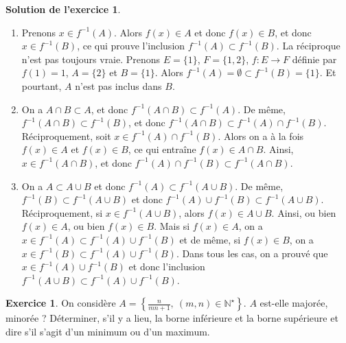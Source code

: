 \documentclass[a4paper, 11pt,openany]{article}%
\theoremstyle{plain}
\theoremstyle{definition}
\newtheorem{exo}{Exercice}
\newtheorem{sol}{Solution de l'exercice}
\theoremstyle{remark}
\newcommand{\N}{\mathbb{N}}
\begin{document}
\begin{sol}
\begin{enumerate}
\item Prenons $x\in f^{-1}(A)$. Alors $f(x) \in A$ et donc $f(x) \in B$, et donc $x \in f^{-1}(B)$, ce qui prouve l'inclusion $f^{-1}(A) \subset f^{-1}(B)$. La réciproque n'est pas toujours vraie. Prenons $E=\{1\}$, $F=\{1,2\}$, $f:E \to F$ définie par $f(1)=1$, $A=\{2\}$ et $B=\{1\}$. Alors $f^{-1}(A)= \emptyset \subset f^{-1}(B)=\{1\}$. Et pourtant, $A$ n'est pas inclus dans $B$.
\item On a $A \cap B\subset A$, et donc $f^{-1}(A \cap B) \subset f^{-1}(A)$. De même, $f^{-1}(A \cap B)\subset f^{-1}(B)$, et donc $f^{-1}(A\cap B) \subset f^{-1}(A) \cap f^{-1}(B)$.\\
Réciproquement, soit $x\in f^{-1}(A) \cap f^{-1}(B)$. Alors on a à la fois $f(x) \in A$ et $f(x) \in B$, ce qui entraîne $f(x) \in A \cap B$. Ainsi, $x \in f^{-1}(A\cap B)$, et donc $f^{-1}(A) \cap f^{-1}(B) \subset f^{-1}(A\cap B)$.
\item On a $A \subset A \cup B$ et donc $f^{-1}(A) \subset f^{-1}(A \cup B)$. De même, $f^{-1}(B) \subset f^{-1}(A \cup B)$ et donc $f^{-1}(A) \cup f^{-1}(B) \subset f^{-1}(A \cup B)$.\\
Réciproquement, si $x \in f^{-1}(A \cup B)$, alors $f(x) \in A \cup B$. Ainsi, ou bien $f(x) \in A$, ou bien $f(x) \in B$. Mais si $f(x) \in A$, on a $x \in f^{-1}(A) \subset f^{-1}(A) \cup f^{-1}(B)$ et de même, si $f(x) \in B$, on a $x \in f^{-1}(B) \subset f^{-1}(A) \cup f^{-1}(B)$. Dans tous les cas, on a prouvé que $x\in f^{-1}(A) \cup f^{-1}(B)$ et donc l'inclusion $f^{-1}(A \cup B) \subset f^{-1}(A) \cup f^{-1}(B)$. 
\end{enumerate}
\end{sol}


\begin{exo}
On considère $\displaystyle{ A = \left\{ \frac{n}{mn +1}, \ (m,n) \in \N^{\star} \right\}}$. $A$ est-elle majorée, minorée ? Déterminer, s'il y a lieu, la borne inférieure et la borne supérieure et dire s'il s'agit d'un minimum ou d'un maximum.
\end{exo}
\end{document}
